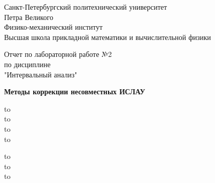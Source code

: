 \documentclass[10pt]{article}
\begin{document}
\begin{titlepage}

\Large

\begin{center}

Санкт-Петербургский политехнический университет \\ Петра Великого \\
Физико-механический институт \\
Высшая школа прикладной математики и вычислительной
физики

\vspace{6em}

Отчет по лабораторной работе №2\\
по дисциплине\\
"Интервальный анализ"\\

\vspace{2em}

\textbf{Методы коррекции несовместных ИСЛАУ}\\

\end{center}


\vspace{5em}

\newbox{\lbox}

\newlength{\maxl}
\setlength{\maxl}{\wd\lbox}

\hfill\parbox{12cm}{
\hspace*{3cm}\hspace*{-5cm}\hfill\hbox to\maxl{ \hfill}\\
\vspace{0.5em}
\hspace*{3cm}\hspace*{-5cm}\hfill\hbox to\\
\hspace*{3cm}\hspace*{-5cm}\hfill\hbox to\\
\hspace*{3cm}\hspace*{-5cm}\hfill\hbox to\\

\vspace{0.5em}

\hspace*{3cm}\hspace*{-5cm}\hfill\hbox to\\
\hspace*{3cm}\hspace*{-5cm}\hfill\hbox to\\
\hspace*{3cm}\hspace*{-5cm}\hfill\hbox to\\
}



\end{titlepage}
\end{document}
